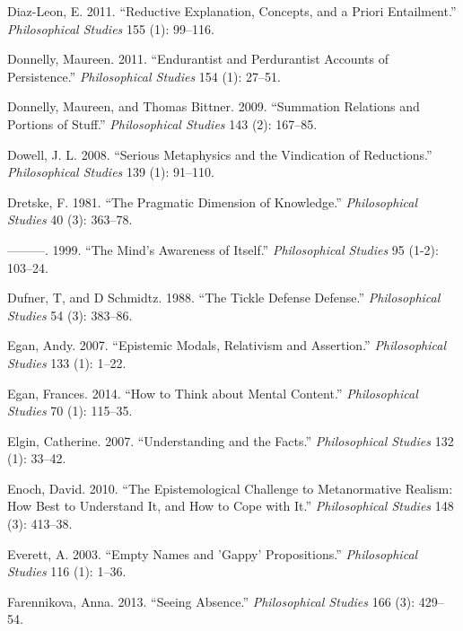 \documentclass[
  10pt,
  letterpaper,
  DIV=11,
  numbers=noendperiod,
  twoside]{scrartcl}
\newlength{\cslhangindent}
\newenvironment{CSLReferences}[2] %
 {\begin{list}{}{%
  \setlength{\itemindent}{0pt}
  \setlength{\leftmargin}{0pt}
  \setlength{\parsep}{0pt}
  \ifodd #1
   \setlength{\leftmargin}{\cslhangindent}
   \setlength{\itemindent}{-1\cslhangindent}
  \fi
  \setlength{\itemsep}{#2\baselineskip}}}
 {\end{list}}
\begin{document}
\begin{CSLReferences}{1}{0}
Diaz-Leon, E. 2011. {``Reductive Explanation, Concepts, and a Priori
Entailment.''} \emph{Philosophical Studies} 155 (1): 99--116.

Donnelly, Maureen. 2011. {``Endurantist and Perdurantist Accounts of
Persistence.''} \emph{Philosophical Studies} 154 (1): 27--51.

Donnelly, Maureen, and Thomas Bittner. 2009. {``Summation Relations and
Portions of Stuff.''} \emph{Philosophical Studies} 143 (2): 167--85.

Dowell, J. L. 2008. {``Serious Metaphysics and the Vindication of
Reductions.''} \emph{Philosophical Studies} 139 (1): 91--110.

Dretske, F. 1981. {``The Pragmatic Dimension of Knowledge.''}
\emph{Philosophical Studies} 40 (3): 363--78.

---------. 1999. {``The Mind's Awareness of Itself.''}
\emph{Philosophical Studies} 95 (1-2): 103--24.

Dufner, T, and D Schmidtz. 1988. {``The Tickle Defense Defense.''}
\emph{Philosophical Studies} 54 (3): 383--86.

Egan, Andy. 2007. {``Epistemic Modals, Relativism and Assertion.''}
\emph{Philosophical Studies} 133 (1): 1--22.

Egan, Frances. 2014. {``How to Think about Mental Content.''}
\emph{Philosophical Studies} 70 (1): 115--35.

Elgin, Catherine. 2007. {``Understanding and the Facts.''}
\emph{Philosophical Studies} 132 (1): 33--42.

Enoch, David. 2010. {``The Epistemological Challenge to Metanormative
Realism: How Best to Understand It, and How to Cope with It.''}
\emph{Philosophical Studies} 148 (3): 413--38.

Everett, A. 2003. {``Empty Names and 'Gappy' Propositions.''}
\emph{Philosophical Studies} 116 (1): 1--36.

Farennikova, Anna. 2013. {``Seeing Absence.''} \emph{Philosophical
Studies} 166 (3): 429--54.


\end{CSLReferences}
\end{document}
